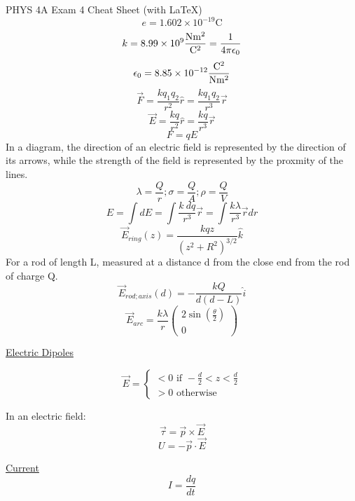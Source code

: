 \documentclass[8pt]{minimal}
\begin{document}
\setlength{\parindent}{0pt}
\setlength{\columnsep}{1cm}
\twocolumn
PHYS 4A Exam 4 Cheat Sheet (with \LaTeX)
\[ e = 1.602 \times 10^{-19} \unit{\coulomb} \]
\[ k = 8.99 \times 10^9 \unit{\frac{\newton\meter^2}{\coulomb^2}}= \frac{1}{4\pi\epsilon_0} \]
\[ \epsilon_0 = 8.85 \times 10^{-12} \unit{\frac{\coulomb^2}{\newton\meter^2}} \]
\[\vec{F} = \frac{kq_1q_2}{r^2}\hat{r} = \frac{kq_1q_2}{r^3}\vec{r}\]
\[\vec{E} = \frac{kq}{r^2}\hat{r} = \frac{kq}{r^3}\vec{r}\]
\[F = qE\]
In a diagram, the direction of an electric field is represented by the direction of its arrows, while the strength of the field is represented by the proxmity of the lines.
\[\lambda = \frac{Q}{r} ; \sigma = \frac{Q}{A} ; \rho = \frac{Q}{V}\]
\[E = \int dE = \int \frac{k\ dq}{r^3}\vec{r} = \int \frac{k \lambda}{r^3}\vec{r}dr\]
\[ \vec{E}_{ring}(z) = \frac{kqz}{(z^2 + R^2)^{3/2}}\hat{k} \]
For a rod of length L, measured at a distance d from the close end from the rod of charge Q.
\[ \vec{E}_{rod;axis}(d) = -\frac{kQ}{d(d-L)}\hat{i} \]
\[ \vec{E}_{arc} = \frac{k\lambda}{r} \begin{pmatrix}2\sin(\frac{\theta}{2})\\0\end{pmatrix} \]

\underline{Electric Dipoles}

\[\vec{E} = \left\{ \begin{matrix}
    < 0 \text{ if } -\frac{d}{2} < z < \frac{d}{2}\\
    > 0 \text{ otherwise}
\end{matrix} \right. \]

In an electric field:
\[\vec{\tau} = \vec{p} \times \vec{E}\]
\[U = -\vec{p} \cdot \vec{E}\]

\underline{Current}
\[ I = \frac{dq}{dt} \]
\end{document}
